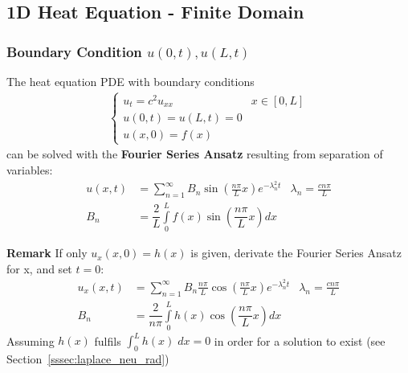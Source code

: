 \subsection{1D Heat Equation - Finite Domain}\label{ssec:1d_heat_fin}
\subsubsection{Boundary Condition \texorpdfstring{$u(0,t), u(L,t)$}{u (0,t), u (L,t)}}
The heat equation PDE with boundary conditions
\begin{align*}
    \begin{cases}
        u_t=c^2u_{xx} & x\in[0,L] \\
        u(0,t)=u(L,t)=0           \\
        u(x,0)=f(x)
    \end{cases}
\end{align*}
can be solved with the \textbf{Fourier Series Ansatz} resulting
from separation of variables:
\begin{align*}
    u(x,t) & =\sum_{n=1}^\infty B_n\sin(\frac{n\pi}Lx)e^{-\lambda_n^2t} & \lambda_n = \frac{cn\pi}{L} \\
    B_n    & =\dfrac{2}{L}\int\limits_0^{L}f(x)\sin(\dfrac{n\pi}{L}x)dx
\end{align*}

\textbf{Remark} If only $u_x(x,0)=h(x)$ is given, derivate the Fourier Series Ansatz for x, and set $t=0$:
\begin{align*}
    u_x(x,t) & =\sum_{n=1}^\infty B_n \frac{n\pi}L\cos(\frac{n\pi}Lx)e^{-\lambda_n^2t} & \lambda_n = \frac{cn\pi}{L} \\
    B_n      & =\dfrac{2}{n\pi}\int\limits_0^{L}h(x)\cos(\dfrac{n\pi}{L}x)dx
\end{align*}
Assuming $h(x)$ fulfils $\int_{0}^{L}h(x)\;dx = 0$ in order for a solution to exist (see Section~\ref{sssec:laplace_neu_rad})

